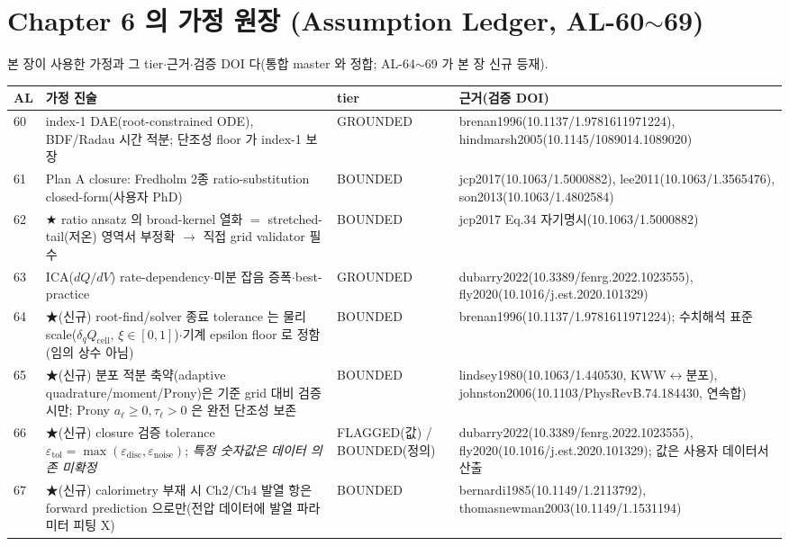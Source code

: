 \documentclass[11pt,a4paper]{article}
\newcommand{\cell}{\mathrm{cell}}
\newcommand{\tol}{\mathrm{tol}}
\newcommand{\noise}{\mathrm{noise}}
\newcommand{\brk}{\discretionary{}{}{}}%
\begin{document}
\section{Chapter 6 의 가정 원장 (Assumption Ledger, AL-60$\sim$69)}\label{sec:ch6_al}
본 장이 사용한 가정과 그 tier$\cdot$근거$\cdot$검증 DOI 다(통합 master 와 정합; AL-64$\sim$69 가 본 장 신규 등재).
{\small
\begin{longtable}{p{} p{} p{} p{}}
\toprule AL & 가정 진술 & tier & 근거(검증 DOI) \\ \midrule \endhead
60 & index-1 DAE(root-constrained ODE), BDF/Radau 시간 적분; 단조성 floor 가 index-1 보장 & GROUNDED & brenan1996(10.1137/\brk 1.9781611971224), hindmarsh2005(10.1145/\brk 1089014.1089020) \\
61 & Plan A closure: Fredholm 2종 ratio-substitution closed-form(사용자 PhD) & BOUNDED & jcp2017(10.1063/\brk 1.5000882), lee2011(10.1063/\brk 1.3565476), son2013(10.1063/\brk 1.4802584) \\
62 & ★ ratio ansatz 의 broad-kernel 열화 $=$ stretched-tail(저온) 영역서 부정확 $\to$ 직접 grid validator 필수 & BOUNDED & jcp2017 Eq.34 자기명시(10.1063/\brk 1.5000882) \\
63 & ICA($dQ/dV$) rate-dependency$\cdot$미분 잡음 증폭$\cdot$best-practice & GROUNDED & dubarry2022(10.3389/\brk fenrg.2022.1023555), fly2020(10.1016/\brk j.est.2020.101329) \\
64 & ★(신규) root-find/solver 종료 tolerance 는 물리 scale($\delta_q Q_\cell$, $\xi\in[0,1]$)$\cdot$기계 epsilon floor 로 정함(임의 상수 아님) & BOUNDED & brenan1996(10.1137/\brk 1.9781611971224); 수치해석 표준 \\
65 & ★(신규) 분포 적분 축약(adaptive quadrature/moment/Prony)은 기준 grid 대비 검증 시만; Prony $a_\ell\ge0,\tau_\ell>0$ 은 완전 단조성 보존 & BOUNDED & lindsey1980(10.1063/\brk 1.440530, KWW$\leftrightarrow$분포), johnston2006(10.1103/\brk PhysRevB.74.184430, 연속합) \\
66 & ★(신규) closure 검증 tolerance $\varepsilon_\tol=\max(\varepsilon_{\mathrm{disc}},\varepsilon_\noise)$; \emph{특정 숫자값은 데이터 의존 미확정} & FLAGGED(값) / BOUNDED(정의) & dubarry2022(10.3389/\brk fenrg.2022.1023555), fly2020(10.1016/\brk j.est.2020.101329); 값은 사용자 데이터서 산출 \\
67 & ★(신규) calorimetry 부재 시 Ch2/Ch4 발열 항은 forward prediction 으로만(전압 데이터에 발열 파라미터 피팅 X) & BOUNDED & bernardi1985(10.1149/\brk 1.2113792), thomasnewman2003(10.1149/\brk 1.1531194) \\

\end{longtable}}
\end{document}
